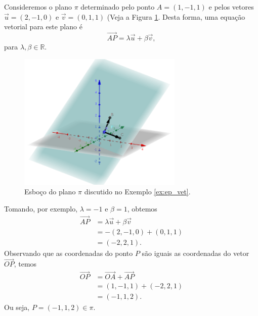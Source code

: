 \begin{ex}\label{ex:ep_vet}
  Consideremos o plano $\pi$ determinado pelo ponto $A = (1,-1,1)$ e pelos vetores $\vec{u} = (2,-1,0)$ e $\vec{v} = (0,1,1)$ (Veja a Figura \ref{fig:ex_ep_vet}. Desta forma, uma equação vetorial para este plano é
  \begin{equation}
    \overrightarrow{AP} = \lambda\vec{u}+\beta\vec{v},
  \end{equation}
  para $\lambda,\beta\in\mathbb{R}$.
  
  \begin{figure}[H]
    \centering
    \includegraphics[width=0.7\textwidth]{./cap_ep/dados/fig_ex_ep_vet/fig_ex_ep_vet}
    \caption{Esboço do plano $\pi$ discutido no Exemplo \ref{ex:ep_vet}.}
    \label{fig:ex_ep_vet}
  \end{figure}
  
  Tomando, por exemplo, $\lambda = -1$ e $\beta = 1$, obtemos
  \begin{align}
    \overrightarrow{AP} &= \lambda\vec{u}+\beta\vec{v}\\
                        &= -(2,-1,0) + (0,1,1)\\
                        &= (-2,2,1).
  \end{align}
  Observando que as coordenadas do ponto $P$ são iguais as coordenadas do vetor $\overrightarrow{OP}$, temos
  \begin{align}
    \overrightarrow{OP} &= \overrightarrow{OA}+\overrightarrow{AP}\\
                        &= (1,-1,1)+(-2,2,1)\\
                        &= (-1,1,2).
  \end{align}
  Ou seja, $P = (-1,1,2)\in\pi$.
\end{ex}

